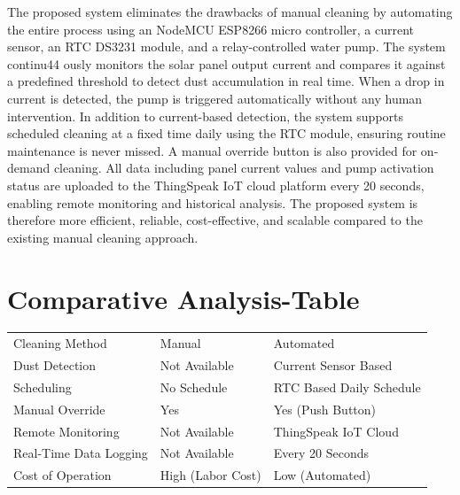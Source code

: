 \documentclass[10pt]{report}
\begin{document}
\begin{sloppypar}
{{{\begin{sloppypar}
The proposed system eliminates the drawbacks of manual cleaning by automating
the entire process using an NodeMCU ESP8266 micro controller, a current sensor,
an RTC DS3231 module, and a relay-controlled water pump. The system continu44
ously monitors the solar panel output current and compares it against a predefined
threshold to detect dust accumulation in real time. When a drop in current is detected, the pump is triggered automatically without any human intervention. In addition to current-based detection, the system supports scheduled cleaning at a fixed
time daily using the RTC module, ensuring routine maintenance is never missed. A
manual override button is also provided for on-demand cleaning. All data including
panel current values and pump activation status are uploaded to the ThingSpeak IoT
cloud platform every 20 seconds, enabling remote monitoring and historical analysis.
The proposed system is therefore more efficient, reliable, cost-effective, and scalable
compared to the existing manual cleaning approach.
\section{Comparative Analysis-Table}

\begin{table}[h]
\centering
\renewcommand{\arraystretch}{1.3}

\begin{tabular}{|p{4cm}|p{5.5cm}|p{5.5cm}|}
\hline

 &  &  \\   %
\hline

Cleaning Method & Manual & Automated \\
\hline

Dust Detection & Not Available & Current Sensor Based \\
\hline

Scheduling & No Schedule & RTC Based Daily Schedule \\
\hline

Manual Override & Yes & Yes (Push Button) \\
\hline

Remote Monitoring & Not Available & ThingSpeak IoT Cloud \\
\hline

Real-Time Data Logging & Not Available & Every 20 Seconds \\
\hline

Cost of Operation & High (Labor Cost) & Low (Automated) \\
\hline


\end{tabular}
\end{table}
\end{sloppypar}}}}
\end{sloppypar}
\end{document}
